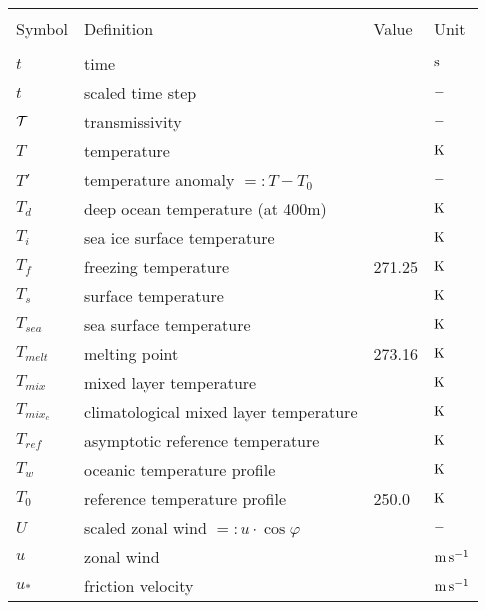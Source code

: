 \begin{tabular*}{\textwidth}{|l@{\extracolsep\fill}lll|}
\hline
\vspace{-3mm} & & & \\
Symbol         & Definition                       & Value   & Unit \\
\hline 
\vspace{-3mm} & & & \\

$t$       & time                             &         & $\rm s$ \\
$t$       & scaled time step                      &         & $\rm -$ \\
${\cal T}$     & transmissivity    &    &$\rm  -$ \\
$T$       & temperature                      &         & $\rm K$
\\
$T'$           & temperature anomaly $=:T-T_0$              &         & $\rm -$ \\
$T_d$          & deep ocean temperature (at 400m)      &         & $\rm K$
\\
$T_i$          & sea ice surface temperature           &         & $\rm K$ \\
$T_f$          & freezing temperature                  & 271.25  & $\rm K$
\\
$T_s$          & surface temperature                   &         & $\rm K$
\\
$T_{sea}$ & sea surface temperature     &    & $\rm K$ \\
$T_{melt}$     & melting point                    & 273.16  & $\rm K$ \\
$T_{mix}$      & mixed layer temperature               &         & $\rm K$ \\
$T_{mix_c}$    & climatological mixed layer temperature     &         & $\rm K$
\\
$T_{ref}$      & asymptotic reference temperature           &         & $\rm K$ \\
$T_w$          & oceanic temperature profile                &         &
$\rm K$ \\
$T_0$          & reference temperature profile         &  250.0  & $\rm K$
\\

$U$       & scaled zonal wind $=:u\cdot\cos\varphi$    &         & $\rm -$ \\
$u$       & zonal wind                       &         & $\rm m\, s^{-1}$
\\
$u_*$          & friction velocity                          &         & $\rm m\, s^{-1}$ \\


\end{tabular*}
